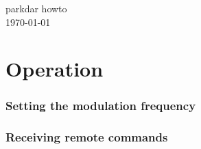 
\newcommand{\isdraft}{1} %

\graphicspath{
              {figs/} %
}



\thispagestyle{empty}   %
\vspace*{\fill}
\begin{center}
    {\huge parkdar howto}\\
    \today
\end{center}
\vspace*{\fill}
\clearpage

\pagestyle{toc}
\tableofcontents
\clearpage
\pagestyle{normal}

\part{Operation}
    \section{Setting the modulation frequency}
        
        
    \clearpage
    \section{Receiving remote commands}
        





\clearpage
\appendix{} %
\noappendicestocpagenum{}   %
\appendixpage{} %
\addappheadtotoc{}  %

%


